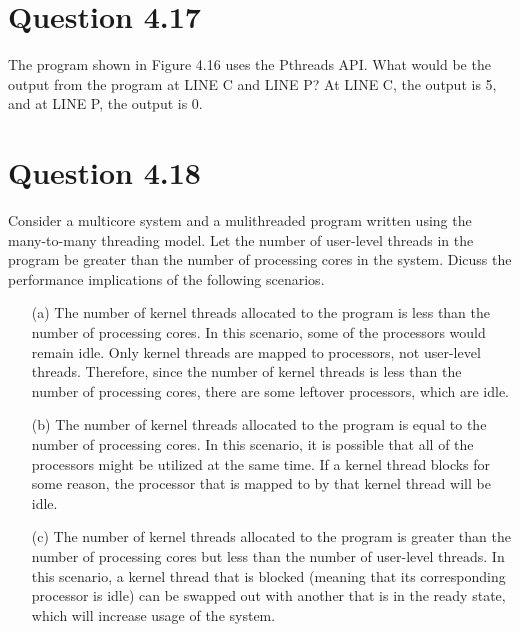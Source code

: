 \documentclass[12pt]{article}
\begin{document}
\section*{Question 4.17} {\color{blue}The program shown in Figure 4.16 uses the Pthreads API. What would be the output from the program at LINE C and LINE P?} At LINE C, the output is 5, and at LINE P, the output is 0.

\section*{Question 4.18} {\color{blue}Consider a multicore system and a mulithreaded program written using the many-to-many threading model. Let the number of user-level threads in the program be greater than the number of processing cores in the system. Dicuss the performance implications of the following scenarios.
\begin{enumerate}
\item[(a)]The number of kernel threads allocated to the program is less than the number of processing cores. {\color{black}
In this scenario, some of the processors would remain idle. Only kernel threads are mapped to processors, not user-level threads. Therefore, since the number of kernel threads is less than the number of processing cores, there are some leftover processors, which are idle.}

\item[(b)]The number of kernel threads allocated to the program is equal to the number of processing cores. {\color{black}
In this scenario, it is possible that all of the processors might be utilized at the same time. If a kernel thread blocks for some reason, the processor that is mapped to by that kernel thread will be idle.
}

\item[(c)]The number of kernel threads allocated to the program is greater than the number of processing cores but less than the number of user-level threads. {\color{black}
In this scenario, a kernel thread that is blocked (meaning that its corresponding processor is idle) can be swapped out with another that is in the ready state, which will increase usage of the system.}
\end{enumerate}
}
\end{document}
